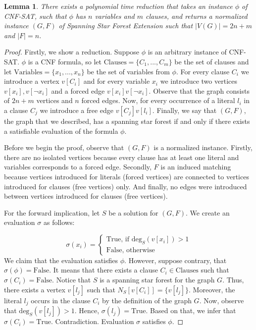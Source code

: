 \documentclass[en]{pracamgr}
\newtheorem{lemma}{Lemma}
\newcommand{\ssfep}{{\sc Spanning Star Forest Extension}}
\newcommand{\cnfsat}{{\sc CNF-SAT}}
\newcommand{\degree}[2]{\textrm{deg}_{#1}(#2)}
\begin{document}
\begin{lemma}\label{ssfep reduction}
	There exists a polynomial time reduction that takes an instance $\phi$ of \cnfsat{}, such that $\phi$ has $n$ variables and $m$ clauses, and returns a normalized instance $(G,F)$ of \ssfep{} such that $|V(G)|=2n+m$ and $|F|=n$.
\end{lemma}

\begin{proof}
	Firstly, we show a reduction. Suppose $\phi$ is an arbitrary instance of \cnfsat{}. $\phi$ is a CNF formula, so let $\textrm{Clauses}=\{C_1,...,C_m\}$ be the set of clauses and let $\textrm{Variables}=\{x_1,...,x_n\}$ be the set of variables from $\phi$. For every clause $C_i$ we introduce a vertex $v[C_i]$ and for every variable $x_i$ we introduce two vertices $v[x_i],v[\neg x_i]$ and a forced edge $v[x_i]v[\neg x_i]$. Observe that the graph consists of $2n+m$ vertices and $n$ forced edges. Now, for every occurrence of a literal $l_i$ in a clause $C_j$ we introduce a free edge $v[C_j]v[l_i]$. Finally, we say that $(G,F)$, the graph that we described, has a spanning star forest if and only if there exists a satisfiable evaluation of the formula $\phi$.
	
	Before we begin the proof, observe that $(G,F)$ is a normalized instance. Firstly, there are no isolated vertices because every clause has at least one literal and variables corresponds to a forced edge. Secondly, $F$ is an induced matching because vertices introduced for literals (forced vertices) are connected to vertices introduced for clauses (free vertices) only. And finally, no edges were introduced between vertices introduced for clauses (free vertices).
	
	For the forward implication, let $S$ be a solution for $(G,F)$. We create an evaluation $\sigma$ as follows:
	
	\begin{equation*}
		\sigma(x_i) = 
		\begin{cases}
			\textrm{True}\text{, if $\degree{S}{v[x_i]} > 1$} \\
			\textrm{False}\text{, otherwise}
		\end{cases}
	\end{equation*}
	We claim that the evaluation satisfies $\phi$. However, suppose contrary, that $\sigma(\phi)=\textrm{False}$. It means that there exists a clause $C_i \in \textrm{Clauses}$ such that $\sigma(C_i)=\textrm{False}$. Notice that $S$ is a spanning star forest for the graph $G$. Thus, there exists a vertex $v[l_j]$ such that $N_S[v[C_i]] = \{v[l_j]\}$. Moreover, the literal $l_j$ occurs in the clause $C_i$ by the definition of the graph $G$. Now, observe that $\degree{S}{v[l_j]} > 1$. Hence, $\sigma(l_j)=\textrm{True}$. Based on that, we infer that $\sigma(C_i)=\textrm{True}$. Contradiction. Evaluation $\sigma$ satisfies $\phi$.
	

\end{proof}
\end{document}
